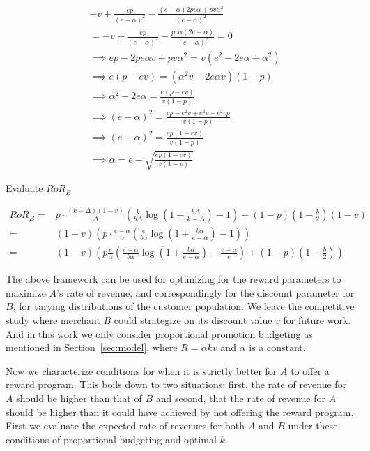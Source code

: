 \begin{align*}
& -v + \frac{ep}{(e-\alpha)^2} - \frac{(e-\alpha)2pv\alpha + pv\alpha^2}{(e-\alpha)^2}\\
&= -v + \frac{ep}{(e-\alpha)^2} - \frac{pv\alpha(2e-\alpha)}{(e-\alpha)^2} = 0\\
&\implies ep - 2pe\alpha v + pv\alpha^2 = v(e^2 - 2e\alpha + \alpha^2)\\
&\implies e(p-ev) = (\alpha^2 v - 2e\alpha v)(1-p)\\
&\implies \alpha^2 - 2e\alpha = \frac{e(p-ev)}{v(1-p)}\\
&\implies (e-\alpha)^2 = \frac{ep - e^2v + e^2 v - e^2 vp}{v(1-p)}\\
&\implies (e-\alpha)^2 = \frac{ep(1-ev)}{v(1-p)}\\
&\implies \alpha = e - \sqrt{\frac{ep(1-ev)}{v(1-p)}}
\end{align*}

{\arpit Evaluate $RoR_B$}

\begin{align*}
RoR_B =& p\cdot\frac{(k-\Delta)(1-v)}{\Delta}\left(\frac{k}{b\Delta}\log\left(1+\frac{b\Delta}{k-\Delta}\right) - 1\right) + (1-p)(1-\frac{b}{2})(1-v)\\
      =& (1-v)\left(p\cdot\frac{e-\alpha}{\alpha}\left(\frac{e}{b\alpha}\log\left(1+\frac{b\alpha}{e-\alpha}\right) - 1\right)\right)\\
      =& (1-v)\left(p\frac{e}{\alpha}\left(\frac{e-\alpha}{b\alpha}\log\left(1+\frac{b\alpha}{e-\alpha}\right) - \frac{e-\alpha}{e}\right) + (1-p)(1-\frac{b}{2})\right)
\end{align*}


The above framework can be used for optimizing for the reward parameters to maximize $A$'s rate of revenue, and correspondingly for the discount parameter for $B$, for varying distributions of the customer population.
We leave the competitive study where merchant $B$ could strategize on its discount value $v$ for future work.
And in this work we only consider proportional promotion budgeting as mentioned in Section~\ref{sec:model}, where $R = \alpha k v$ and $\alpha$ is a constant.

Now we characterize conditions for when it is strictly better for $A$ to offer a reward program.
This boils down to two situations: first, the rate of revenue for $A$ should be higher than that of $B$ and second, that the rate of revenue for $A$ should be higher than it could have achieved by not offering the reward program.
First we evaluate the expected rate of revenues for both $A$ and $B$ under these conditions of proportional budgeting and optimal $k$.


